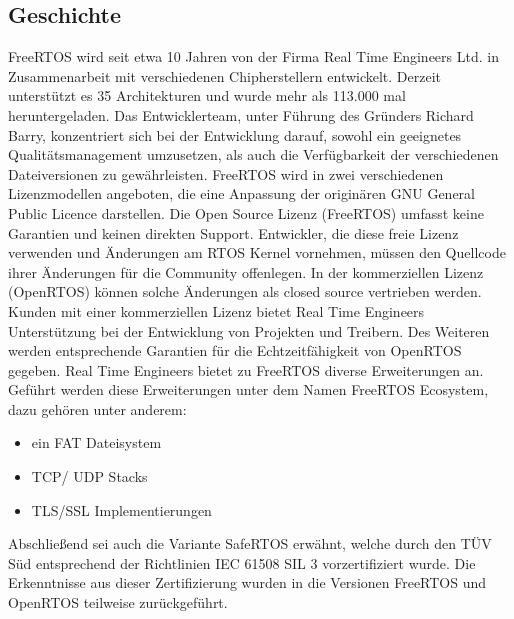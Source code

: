 \subsection{Geschichte}
FreeRTOS wird seit etwa 10 Jahren von der Firma Real Time Engineers Ltd. in Zusammenarbeit mit verschiedenen Chipherstellern entwickelt. Derzeit unterstützt es 35 Architekturen und wurde mehr als 113.000 mal heruntergeladen. Das Entwicklerteam, unter Führung des Gründers Richard Barry, konzentriert sich bei der Entwicklung darauf, sowohl ein geeignetes Qualitätsmanagement umzusetzen, als auch die Verfügbarkeit der verschiedenen Dateiversionen zu gewährleisten. FreeRTOS wird in zwei verschiedenen Lizenzmodellen angeboten, die eine Anpassung der originären GNU General Public Licence darstellen. Die Open Source Lizenz (FreeRTOS) umfasst keine Garantien und keinen direkten Support. Entwickler, die diese freie Lizenz verwenden und Än\-der\-ungen am RTOS Kernel vornehmen, müssen den Quellcode ihrer Än\-der\-ungen für die Community offenlegen. In der kommerziellen Lizenz \newline (OpenRTOS) können solche Änderungen als closed source vertrieben werden. Kunden mit einer kommerziellen Lizenz bietet Real Time Engineers Unterstützung bei der Entwicklung von Projekten und Treibern. Des Weiteren werden entsprechende Garantien für die Echt\-zeit\-fähig\-keit von OpenRTOS gegeben. Real Time Engineers bietet zu FreeRTOS diverse Erweiterungen an. Ge\-führt werden diese Erweiterungen unter dem Namen FreeRTOS Ecosystem, dazu gehören unter anderem:
\begin{itemize}
	\item ein FAT Dateisystem
	\item TCP/ UDP Stacks
	\item TLS/SSL Implementierungen
\end{itemize}
Abschließend sei auch die Variante SafeRTOS erwähnt, welche durch den TÜV Süd entsprechend der Richtlinien IEC 61508 SIL 3 vorzertifiziert wurde. Die Erkenntnisse aus dieser Zertifizierung wurden in die Versionen FreeRTOS und OpenRTOS teilweise zurückgeführt\cite{FreeRtosAdvanced}.
